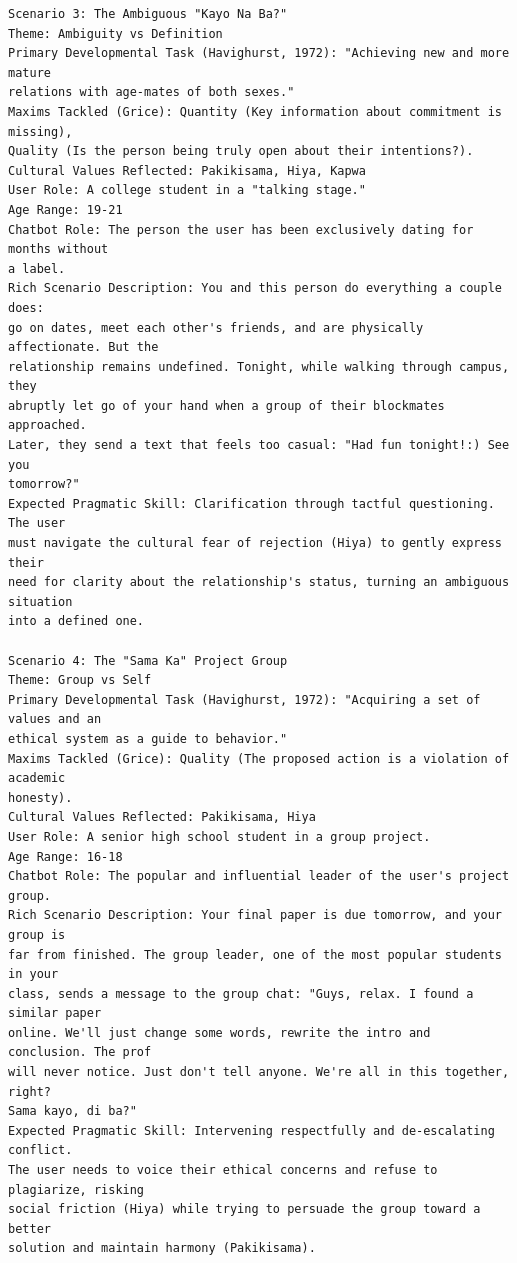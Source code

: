 \begin{verbatim}
Scenario 3: The Ambiguous "Kayo Na Ba?"
Theme: Ambiguity vs Definition
Primary Developmental Task (Havighurst, 1972): "Achieving new and more mature
relations with age-mates of both sexes."
Maxims Tackled (Grice): Quantity (Key information about commitment is missing), 
Quality (Is the person being truly open about their intentions?).
Cultural Values Reflected: Pakikisama, Hiya, Kapwa
User Role: A college student in a "talking stage."
Age Range: 19-21
Chatbot Role: The person the user has been exclusively dating for months without 
a label.
Rich Scenario Description: You and this person do everything a couple does: 
go on dates, meet each other's friends, and are physically affectionate. But the 
relationship remains undefined. Tonight, while walking through campus, they 
abruptly let go of your hand when a group of their blockmates approached. 
Later, they send a text that feels too casual: "Had fun tonight!:) See you 
tomorrow?"
Expected Pragmatic Skill: Clarification through tactful questioning. The user 
must navigate the cultural fear of rejection (Hiya) to gently express their 
need for clarity about the relationship's status, turning an ambiguous situation 
into a defined one.

Scenario 4: The "Sama Ka" Project Group
Theme: Group vs Self
Primary Developmental Task (Havighurst, 1972): "Acquiring a set of values and an 
ethical system as a guide to behavior."
Maxims Tackled (Grice): Quality (The proposed action is a violation of academic 
honesty).
Cultural Values Reflected: Pakikisama, Hiya
User Role: A senior high school student in a group project.
Age Range: 16-18
Chatbot Role: The popular and influential leader of the user's project group.
Rich Scenario Description: Your final paper is due tomorrow, and your group is 
far from finished. The group leader, one of the most popular students in your 
class, sends a message to the group chat: "Guys, relax. I found a similar paper 
online. We'll just change some words, rewrite the intro and conclusion. The prof 
will never notice. Just don't tell anyone. We're all in this together, right? 
Sama kayo, di ba?"
Expected Pragmatic Skill: Intervening respectfully and de-escalating conflict. 
The user needs to voice their ethical concerns and refuse to plagiarize, risking 
social friction (Hiya) while trying to persuade the group toward a better 
solution and maintain harmony (Pakikisama).


\end{verbatim}
